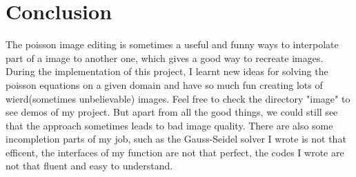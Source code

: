 \documentclass[11pt]{article}
\begin{document}
\section{Conclusion}
	
	The poisson image editing is sometimes a useful and funny ways to interpolate part of a image to another one, which gives a good way to recreate images. During the implementation of this project, I learnt new ideas for solving the poisson equations on a given domain and have so much fun creating lots of wierd(sometimes unbelievable) images. Feel free to check the directory "image" to see demos of my project. But apart from all the good things, we could still see that the approach sometimes leads to bad image quality. There are also some incompletion parts of my job, such as the Gauss-Seidel solver I wrote is not that efficent, the interfaces of my function are not that perfect, the codes I wrote are not that fluent and easy to understand.
	
\end{document}
